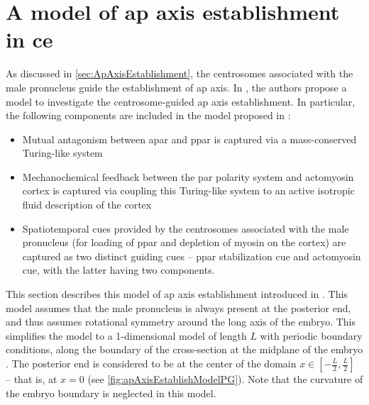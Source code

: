 \section{A model of \acs{ap} axis establishment in \acs{ce}}\label{sec:apAxisEstablishModelPG}
As discussed in \autoref{sec:ApAxisEstablishment}, the centrosomes associated with the male pronucleus guide the establishment of \ac{ap} axis. In \cite{gross2019guiding}, the authors propose a model to investigate the centrosome-guided \ac{ap} axis establishment. In particular, the following components are included in the model proposed in \cite{gross2019guiding}:
\begin{itemize}
    \item Mutual antagonism between \ac{apar} and \ac{ppar} \citep{hoege2013principles} is captured via a mass-conserved Turing-like system \citep{goehring2011advectionpolarization,lee2015self,halatek2018rethinking}
    \item Mechanochemical feedback between the \ac{par} polarity system and actomyosin cortex is captured via coupling this Turing-like system to an active isotropic fluid description of the cortex \citep{mayer2010anisotropies,bois2011pattern}
    \item Spatiotemporal cues provided by the centrosomes associated with the male pronucleus (for loading of \ac{ppar} and depletion of myosin on the cortex) are captured as two distinct guiding cues -- \ac{ppar} stabilization cue and actomyosin cue, with the latter having two components.
\end{itemize}
This section describes this model of \ac{ap} axis establishment introduced in \cite{gross2019guiding}. This model assumes that the male pronucleus is always present at the posterior end, and thus assumes rotational symmetry around the long axis of the embryo. This simplifies the model to a 1-dimensional model of length $L$ with periodic boundary conditions, along the boundary of the cross-section at the midplane of the embryo \citep{gross2019guiding}. The posterior end is considered to be at the center of the domain $x \in [-\frac{L}{2},\frac{L}{2}]$ -- that is, at $x = 0$ (see \autoref{fig:apAxisEstablishModelPG}). Note that the curvature of the embryo boundary is neglected in this model.


